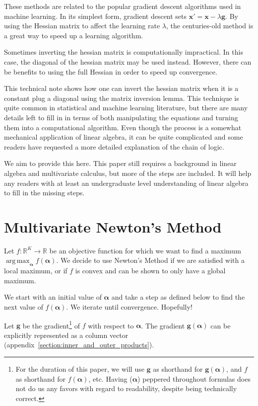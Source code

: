 \documentclass[twoside]{article}
\DeclareMathOperator*{\argmax}{arg\,max} %
\begin{document}
These methods are related to the popular gradient descent algorithms used in machine learning. In its simplest form, gradient descent sets $\boldsymbol{x}' = \boldsymbol{x} - \lambda\boldsymbol{g}$. By using the Hessian matrix to affect the learning rate $\lambda$, the centuries-old method is a great way to speed up a learning algorithm.

Sometimes inverting the hessian matrix is computationally impractical. In this case, the diagonal of the hessian matrix may be used instead\cite{becker}. However, there can be benefits to using the full Hessian in order to speed up convergence.

This technical note shows how one can invert the hessian matrix when it is a constant plug a diagonal using the matrix inversion lemma. This technique is quite common in statistical and machine learning literature\cite[Appendix~A.2]{blei}\cite[Section~4]{sklar}\cite[p. 214]{ng}\cite{minka}, but there are many details left to fill in in terms of both manipulating the equations and turning them into a computational algorithm. Even though the process is a somewhat mechanical application of linear algebra, it can be quite complicated and some readers have requested a more detailed explanation of the chain of logic.

We aim to provide this here. This paper still requires a background in linear algebra and multivariate calculus, but more of the steps are included. It will help any readers with at least an undergraduate level understanding of linear algebra to fill in the missing steps.

\section{Multivariate Newton's Method}

Let $f: \mathbb{R}^K \rightarrow \mathbb{R}$ be an objective function for which we want to find a maximum $\argmax_{\boldsymbol{\alpha}} f(\boldsymbol{\alpha})$. We decide to use Newton's Method if we are satisfied with a local maximum, or if $f$ is convex and can be shown to only have a global maximum.

We start with an initial value of $\boldsymbol{\alpha}$ and take a step as defined below to find the next value of $f(\boldsymbol{\alpha})$. We iterate until convergence. Hopefully!

Let $\boldsymbol{g}$ be the gradient\footnote{For the duration of this paper, we will use $\boldsymbol{g}$ as shorthand for $\boldsymbol{g}(\boldsymbol{\alpha})$, and $f$ as shorthand for $f(\boldsymbol{\alpha})$, etc. Having ($\boldsymbol{\alpha}$) peppered throughout formulas does not do us any favors with regard to readability, despite being technically correct.} of $f$ with respect to $\boldsymbol{\alpha}$. The gradient $\boldsymbol{g}(\boldsymbol{\alpha})$ can be explicitly represented as a column vector (appendix~\ref{section:inner_and_outer_products}).
\end{document}
